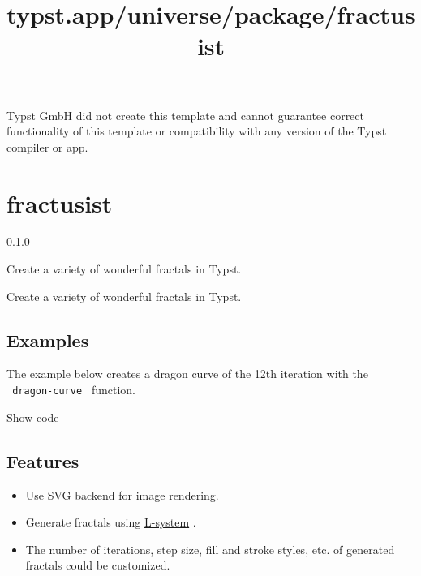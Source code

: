 Typst GmbH did not create this template and cannot guarantee correct
functionality of this template or compatibility with any version of the
Typst compiler or app.


\title{typst.app/universe/package/fractusist}

\label{banner}
\section{fractusist}\label{fractusist}

{ 0.1.0 }

Create a variety of wonderful fractals in Typst.

\label{readme}
Create a variety of wonderful fractals in Typst.

\subsection{Examples}\label{examples}

The example below creates a dragon curve of the 12th iteration with the
\texttt{\ dragon-curve\ } function.


Show code

\begin{Shaded}
\begin{Highlighting}[]

\NormalTok{  )}
\NormalTok{)}
\end{Highlighting}
\end{Shaded}

\subsection{Features}\label{features}

\begin{itemize}
\tightlist
\item
  Use SVG backend for image rendering.
\item
  Generate fractals using
  \href{https://en.wikipedia.org/wiki/L-system}{L-system} .
\item
  The number of iterations, step size, fill and stroke styles, etc. of
  generated fractals could be customized.
\end{itemize}

